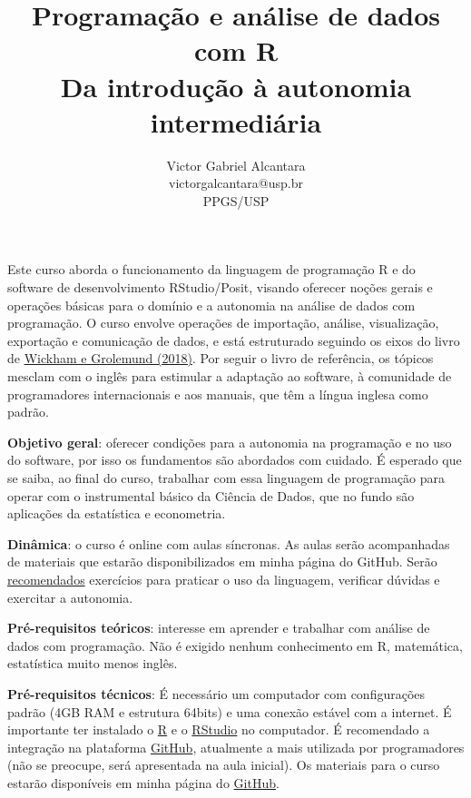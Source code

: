 \documentclass[a4paper,12pt]{article}
\title{\vspace{-3cm}Programação e análise de dados com R \\ \large Da introdução à autonomia intermediária}
\author{Victor Gabriel Alcantara \\ victorgalcantara@usp.br \\ PPGS/USP}
\date{}
\begin{document}
\maketitle

Este curso aborda o funcionamento da linguagem de programação R e do software de desenvolvimento RStudio/Posit, visando oferecer noções gerais e operações básicas para o domínio e a autonomia na análise de dados com programação. O curso envolve operações de importação, análise, visualização, exportação e comunicação de dados, e está estruturado seguindo os eixos do livro de \href{https://r4ds.had.co.nz/}{Wickham e Grolemund (2018)}. Por seguir o livro de referência, os tópicos mesclam com o inglês para estimular a adaptação ao software, à comunidade de programadores internacionais e aos manuais, que têm a língua inglesa como padrão.

\vspace{1cm}

\textbf{Objetivo geral}: oferecer condições para a autonomia na programação e no uso do software, por isso os fundamentos são abordados com cuidado. É esperado que se saiba, ao final do curso, trabalhar com essa linguagem de programação para operar com o instrumental básico da Ciência de Dados, que no fundo são aplicações da estatística e econometria.

\vspace{0.5cm}

\textbf{Dinâmica}: o curso é online com aulas síncronas. As aulas serão acompanhadas de materiais que estarão disponibilizados em minha página do GitHub. Serão \underline{recomendados} exercícios para praticar o uso da linguagem, verificar dúvidas e exercitar a autonomia.

\vspace{0.5cm}

\textbf{Pré-requisitos teóricos}: interesse em aprender e trabalhar com análise de dados com programação. Não é exigido nenhum conhecimento em R, matemática, estatística muito menos inglês.

\vspace{0.5cm}

\textbf{Pré-requisitos técnicos}: É necessário um computador com configurações padrão (4GB RAM e estrutura 64bits) e uma conexão estável com a internet. É importante ter instalado o \href{https://brieger.esalq.usp.br/CRAN/}{R} e o \href{https://www.rstudio.com/products/rstudio/download}{RStudio} no computador. É recomendado a integração na plataforma \href{https://github.com/}{GitHub}, atualmente a mais utilizada por programadores (não se preocupe, será apresentada na aula inicial). Os materiais para o curso estarão disponíveis em minha página do \href{https://github.com/victorgalcantara?tab=repositories}{GitHub}.
\end{document}
